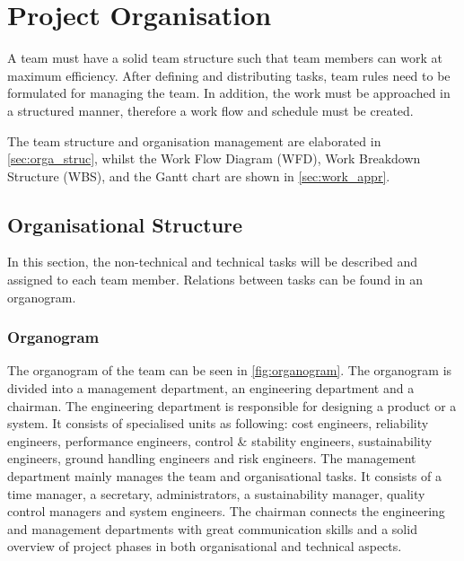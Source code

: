 \chapter{Project Organisation}
\label{ch:proj_orga}

A team must have a solid team structure such that team members can work at maximum efficiency. After defining and distributing tasks, team rules need to be formulated for managing the team. In addition, the work must be approached in a structured manner, therefore a work flow and schedule must be created.

The team structure and organisation management are elaborated in \autoref{sec:orga_struc}, whilst the Work Flow Diagram (WFD), Work Breakdown Structure (WBS), and the Gantt chart are shown in \autoref{sec:work_appr}. 


\section{Organisational Structure}
\label{sec:orga_struc}
In this section, the non-technical and technical tasks will be described and assigned to each team member. Relations between tasks can be found in an organogram.

\subsection{Organogram}

The organogram of the team can be seen in \autoref{fig:organogram}. 
The organogram is divided into a management department, an engineering department and a chairman. 
The engineering department is responsible for designing a product or a system. It consists of specialised units as following: cost engineers, reliability engineers, performance engineers, control \& stability engineers, sustainability engineers, ground handling engineers and risk engineers.
The management department mainly manages the team and organisational tasks. It consists of a time manager, a secretary, administrators, a sustainability manager, quality control managers and system engineers. The chairman connects the engineering and management departments with great communication skills and a solid overview of project phases in both organisational and technical aspects.


